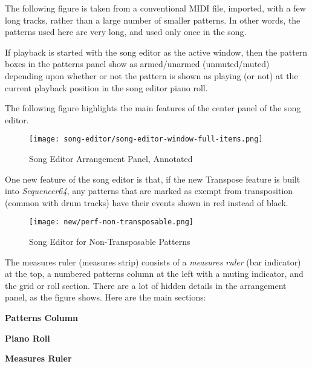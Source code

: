    The following figure is taken from a conventional MIDI file, imported,
   with a few long tracks, rather than a large number of smaller patterns.
   In other words, the patterns used here are very long, and used only once
   in the song.

   If playback is started with the song editor as the
   active window, then the pattern boxes in the patterns panel
   show as armed/unarmed (unmuted/muted) depending upon whether or not the
   pattern is shown as playing (or not) at the current playback position in
   the song editor piano roll.

   The following figure highlights the main features of the center panel of the
   song editor.

\begin{figure}[H]
   \centering 
   \texttt{[image: song-editor/song-editor-window-full-items.png]}
   \caption{Song Editor Arrangement Panel, Annotated}
   \label{fig:song_editor_window_full_items}
\end{figure}

   One new feature of the song editor is that, if the new Transpose feature is
   built into \textsl{Sequencer64}, any patterns that are marked as exempt from
   transposition (common with drum tracks) have their events shown in red
   instead of black.

\begin{figure}[H]
   \centering 
   \texttt{[image: new/perf-non-transposable.png]}
   \caption{Song Editor for Non-Transposable Patterns}
   \label{fig:song_editor_non_transposable_items}
\end{figure}

   The measures ruler (measures strip)
   consists of a \textsl{measures ruler} (bar indicator) at the top, a
   numbered patterns column at the left with a muting indicator, and the
   grid or roll section.  There are a lot of hidden details in the
   arrangement panel, as the figure shows.  Here are the main sections:

   \begin{enumber}
      \item \textbf{Patterns Column}
      \item \textbf{Piano Roll}
      \item \textbf{Measures Ruler}
   \end{enumber}


